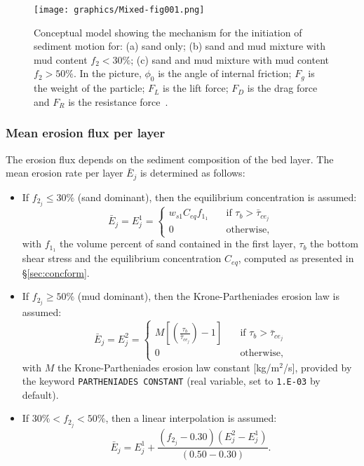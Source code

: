 \begin{figure}[H]
\begin{center}
\texttt{[image: graphics/Mixed-fig001.png]}
\caption{Conceptual model showing the mechanism for the initiation of sediment motion for: (a) sand only; (b) sand and mud mixture with mud content $f_2 < 30\%$; (c) sand and mud mixture with mud content $f_2 > 50\%$. In the picture, $\phi_0$ is the angle of internal friction; $F_g$ is the weight of the particle; $F_L$ is the lift force; $F_D$ is the drag force and $F_R$ is the resistance force~\cite{deLinaresthesis}.}\label{fig:mixed_regime}
\end{center}
\end{figure}

\subsubsection{Mean erosion flux per layer}
The erosion flux depends on the sediment composition of the bed layer. The mean erosion rate per layer $\bar E_j$ is determined as follows:
\begin{itemize}
\item If $f_{2_j} \leq 30\%$ (sand dominant), then the equilibrium concentration is assumed:
\begin{equation*}
\bar E_j = E_j^1 = \left\{\begin{array}{ll}
w_{s1} C_{eq} f_{1_1} \quad & \text{if}\,\,\tau_b>\bar \tau_{ce_j}\\  
0\quad & \text{otherwise},
\end{array}
\right. 
\end{equation*}
with $f_{1_1}$ the volume percent of sand contained in the first layer, 
$\tau_b$ the bottom shear stress and the equilibrium concentration $C_{eq}$, computed as presented in \S\ref{sec:concform}. 
\item If $f_{2_j} \geq 50\%$ (mud dominant), then the Krone-Partheniades erosion law is assumed:
\begin{equation*}
\bar E_j = E_j^2 = \left\{\begin{array}{ll}
M\left[\left(\frac{\tau_b}{\bar \tau_{ce_j}}\right)-1\right]\quad & \text{if}\,\,\tau_b>\bar \tau_{ce_j}\\  
0\quad & \text{otherwise},
\end{array}
\right. 
\end{equation*}
with $M$ the Krone-Partheniades erosion law constant [kg/m$^2$/s], provided by the keyword \texttt{PARTHENIADES CONSTANT} (real variable, set to \texttt{1.E-03} by default).

\item If $30\% < f_{2_j} < 50\%$, then a linear interpolation is assumed:
\begin{equation*}
\bar E_j = E_j^1 + \frac{(f_{2_j}-0.30)(E_j^2-E_j^1)}{(0.50-0.30)}.
\end{equation*}

\end{itemize}

